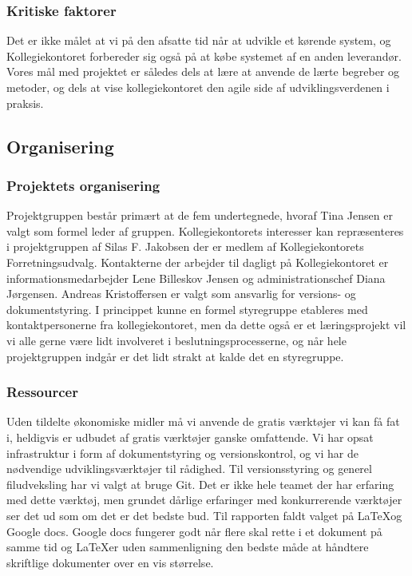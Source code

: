 \documentclass[12pt, a4paper]{report}
\begin{document}
\subsubsection{Kritiske faktorer}
Det er ikke målet at vi på den afsatte tid når at udvikle et kørende system, og Kollegiekontoret forbereder sig også på at købe systemet af en anden leverandør. Vores mål med projektet er således dels at lære at anvende de lærte begreber og metoder, og dels at vise kollegiekontoret den agile side af udviklingsverdenen i praksis.

\subsection{Organisering}
\subsubsection{Projektets organisering}
Projektgruppen består primært at de fem undertegnede, hvoraf Tina Jensen er valgt som formel leder af gruppen. Kollegiekontorets interesser kan repræsenteres i projektgruppen af Silas F. Jakobsen der er medlem af Kollegiekontorets Forretningsudvalg. Kontakterne der arbejder til dagligt på Kollegiekontoret er informationsmedarbejder Lene Billeskov Jensen og administrationschef Diana Jørgensen. Andreas Kristoffersen er valgt som ansvarlig for versions- og dokumentstyring.
I princippet kunne en formel styregruppe etableres med kontaktpersonerne fra kollegiekontoret, men da dette også er et læringsprojekt vil vi alle gerne være lidt involveret i beslutningsprocesserne, og når hele projektgruppen indgår er det lidt strakt at kalde det en styregruppe.

\subsubsection{Ressourcer}
Uden tildelte økonomiske midler må vi anvende de gratis værktøjer vi kan få fat i, heldigvis er udbudet af gratis værktøjer ganske omfattende. Vi har opsat infrastruktur i form af dokumentstyring og versionskontrol, og vi har de nødvendige udviklingsværktøjer til rådighed.
Til versionsstyring og generel filudveksling har vi valgt at bruge Git. Det er ikke hele teamet der har erfaring med dette værktøj, men grundet dårlige erfaringer med konkurrerende værktøjer ser det ud som om det er det bedste bud.
Til rapporten faldt valget på \LaTeX og Google docs. Google docs fungerer godt når flere skal rette i et dokument på samme tid og \LaTeX er uden sammenligning den bedste måde at håndtere skriftlige dokumenter over en vis størrelse.
\end{document}
